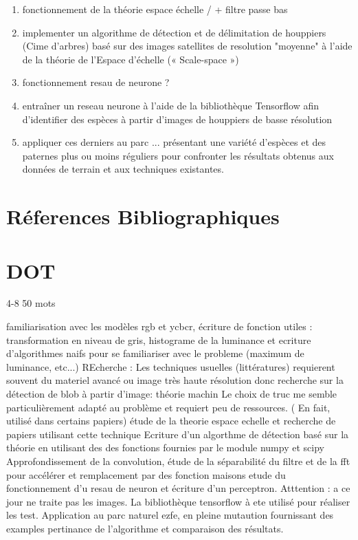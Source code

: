 \documentclass{article}
\begin{document}
\begin{enumerate}
    \item fonctionnement de la théorie espace échelle / + filtre passe bas
	\item implementer un algorithme de détection et de délimitation de houppiers (Cime d'arbres) basé sur des images satellites de resolution "moyenne" à l'aide de la théorie de l'Espace d'échelle (« Scale-space ») 
    \item fonctionnement resau de neurone ?
    \item entraîner un reseau neurone à l'aide de la bibliothèque Tensorflow afin d'identifier des espèces à partir d'images de houppiers de basse résolution 
	\item appliquer ces derniers au parc ... présentant une variété d'espèces et des paternes plus ou moins réguliers pour confronter les résultats obtenus aux données de terrain et aux techniques existantes.    
\end{enumerate}
	

\section{Réferences Bibliographiques}

\section{DOT}
4-8
50 mots

familiarisation avec les modèles rgb et ycbcr, écriture de fonction utiles : transformation en niveau de gris, histograme de la luminance et ecriture d'algorithmes naifs pour se familiariser avec le probleme (maximum de luminance, etc...)
REcherche : Les techniques usuelles (littératures) requierent souvent du materiel avancé ou image très haute résolution donc recherche sur la détection de blob à partir d'image: théorie machin Le choix de truc me semble particulièrement adapté au problème et requiert peu de ressources. ( En fait, utilisé dans certains papiers)
étude de la theorie espace echelle et recherche de papiers utilisant cette technique 
Ecriture d'un algorthme de détection basé sur la théorie en utilisant des des fonctions fournies par le module numpy et scipy 
Approfondissement de la convolution, étude de la séparabilité du filtre et de la fft pour accélérer et remplacement par des fonction maisons 
etude du fonctionnement d'u resau de neuron et écriture d'un perceptron. Atttention : a ce jour ne traite pas les images. La bibliothèque tensorflow à ete utilisé pour réaliser les test.
Application au parc naturel ezfe, en pleine mutaution fournissant des examples pertinance de l'algorithme et  comparaison des résultats.
\end{document}
